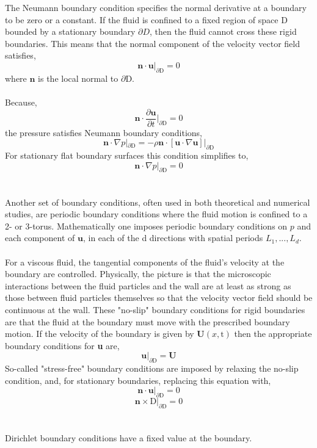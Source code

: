 \documentclass[12pt]{article}
\begin{document}
\begin{flushleft}
The Neumann boundary condition specifies the normal derivative at a boundary to be zero or a constant. If the fluid is confined to a fixed region of space D bounded by a stationary boundary $\partial D$, then the fluid cannot cross these rigid boundaries. This means that the normal component of the velocity vector field satisfies,
$$\textbf{n}\cdot\textbf{u}|_{\partial \text{D}} = 0$$
where $\textbf{n}$ is the local normal to $\partial $D.
\\~\\
Because,
$$\textbf{n}\cdot\frac{\partial \textbf{u}}{\partial t}\Bigg| _{\partial \text{D}} = 0$$
the pressure satisfies Neumann boundary conditions,
$$\textbf{n}\cdot \nabla p|_{\partial \text{D}} = -\rho\textbf{n}\cdot [\textbf{u}\cdot\nabla\textbf{u}]|_{\partial \text{D}}$$
For stationary flat boundary surfaces this condition simplifies to,
$$\textbf{n}\cdot\nabla p|_{\partial \text{D}} = 0$$
\\~\\
Another set of boundary conditions, often used in both theoretical and numerical studies, are periodic boundary conditions where the fluid motion is confined to a 2- or 3-torus. Mathematically one imposes periodic boundary conditions on $p$ and each component of $\textbf{u}$, in each of the d directions with spatial periods $L_1,...,L_d$. 
\\~\\
For a viscous fluid, the tangential components of the fluid's velocity at the boundary
are controlled. Physically, the picture is that the microscopic interactions
between the fluid particles and the wall are at least as strong as those
between fluid particles themselves so that the velocity vector field should
be continuous at the wall. These "no-slip" boundary conditions for
rigid boundaries are that the fluid at the boundary must move with the prescribed
boundary motion. If the velocity of the boundary is given by $\textbf{U}(x, \text{t})$ then the appropriate boundary conditions for \textbf{u} are,
$$\textbf{u}|_{\partial \text{D}} = \textbf{U}$$
So-called "stress-free" boundary conditions are imposed by relaxing the
no-slip condition, and, for stationary boundaries, replacing this equation with,
$$\textbf{n}\cdot \textbf{u}|_{\partial \text{D}} = 0$$
$$\textbf{n}\times\text{D}|_{\partial \text{D}} = 0$$
\\~\\
Dirichlet boundary conditions have a fixed value at the boundary.
\\~\\

\end{flushleft}
\end{document}
